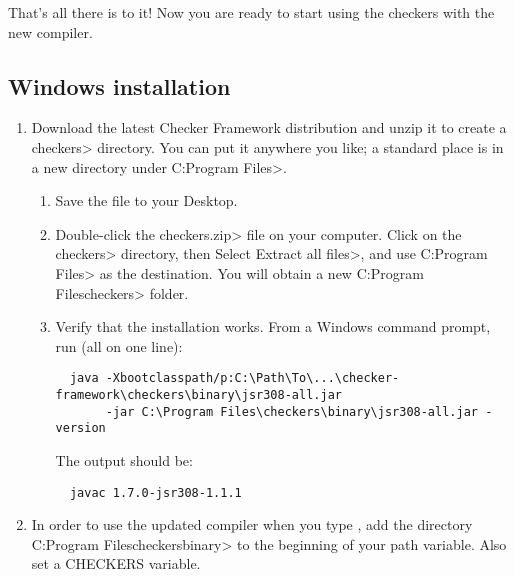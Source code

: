 That's all there is to it!  Now you are ready to start using the checkers with
the new  compiler.

\subsection{Windows installation\label{windows-installation}}

\begin{enumerate}

\item
  Download the latest Checker Framework distribution
  and unzip it to create a \<checkers> directory.  You can put it anywhere
  you like; a standard place is in a new directory under \<C:\ttbs{}Program
  Files>.

\begin{enumerate}
\item
  Save the file
  to your Desktop.
\item
  Double-click the \<checkers.zip> file on your computer.  Click on
  the \<checkers> directory, then Select \<Extract all files>, and use
  \<C:\ttbs{}Program Files> as the destination.  You will obtain a new
  \<C:\ttbs{}Program Files\ttbs{}checkers> folder.
\item
  Verify that the installation works.  From a Windows command prompt, run
  (all on one line):

\begin{Verbatim}
  java -Xbootclasspath/p:C:\Path\To\...\checker-framework\checkers\binary\jsr308-all.jar
       -jar C:\Program Files\checkers\binary\jsr308-all.jar -version
\end{Verbatim}

The output should be:

\begin{Verbatim}
  javac 1.7.0-jsr308-1.1.1
\end{Verbatim}

\end{enumerate}


\item
  In order to use the updated compiler when you type , add the
  directory \<C:\ttbs{}Program Files\ttbs{}checkers\ttbs{}binary> to the
  beginning of your path variable.  Also set a CHECKERS variable.


\end{enumerate}
